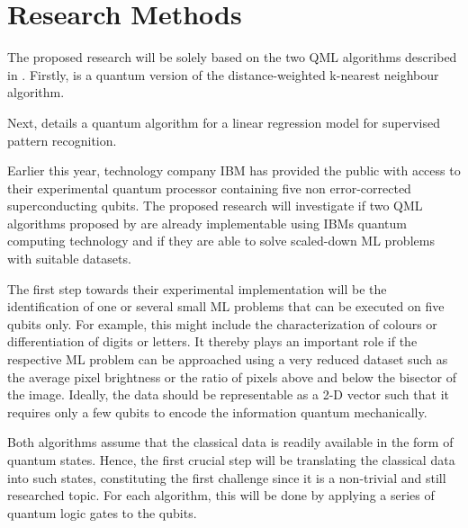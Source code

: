 \documentclass[a4paper]{article}
\newcommand*{\0}{$\ket{0}$}
\newcommand*{\1}{$\ket{1}$}
\begin{document}
\newpage
		
\section{Research Methods}
\label{sec:researchmethods}



The proposed research will be solely based on the two QML algorithms described in \cite{Schuld2014, Schuld2016}. Firstly, \cite{Schuld2014} is a quantum version of the distance-weighted k-nearest neighbour algorithm.


Next, \cite{Schuld2016} details a quantum algorithm for a linear regression model for supervised pattern recognition. 

Earlier this year, technology company IBM has provided the public with access to their experimental quantum processor containing five non error-corrected superconducting qubits. The proposed research will investigate if two QML algorithms proposed by \cite{Schuld2014, Schuld2016} are already implementable using IBMs quantum computing technology and if they are able to solve scaled-down ML problems with suitable datasets. 

The first step towards their experimental implementation will be the identification of one or several small ML problems that can be executed on five qubits only. For example, this might include the characterization of colours or differentiation of digits or letters. It thereby plays an important role if the respective ML problem can be approached using a very reduced dataset such as the average pixel brightness or the ratio of pixels above and below the bisector of the image. Ideally, the data should be representable as a 2-D vector such that it requires only a few qubits to encode the information quantum mechanically.

Both algorithms assume that the classical data is readily available in the form of quantum states. Hence, the first crucial step will be translating the classical data into such states, constituting the first challenge since it is a non-trivial and still researched topic. For each algorithm, this will be done by applying a series of quantum logic gates to the qubits. 
\end{document}
